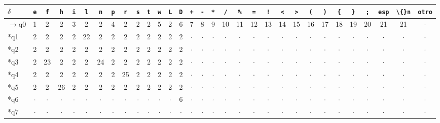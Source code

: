 \begin{longtable}{l|cccccccccccccccccccccccccccccc}
$\delta$ & \texttt{e} & \texttt{f} & \texttt{h} & \texttt{i} & \texttt{l} & \texttt{n} & \texttt{p} & \texttt{r} & \texttt{s} & \texttt{t} & \texttt{w} & \texttt{L} & \texttt{D} & \texttt{+} & \texttt{-} & \texttt{*} & \texttt{/} & \texttt{\%} & \texttt{=} & \texttt{!} & \texttt{<} & \texttt{>} & \texttt{(} & \texttt{)} & \texttt{\{} & \texttt{\}} & \texttt{;} & \texttt{esp} & \texttt{\textbackslash\{\}n} & \texttt{otro} \\ \hline
\endhead
$\rightarrow$q0 & 1 & 2 & 2 & 3 & 2 & 2 & 4 & 2 & 2 & 2 & 5 & 2 & 6 & 7 & 8 & 9 & 10 & 11 & 12 & 13 & 14 & 15 & 16 & 17 & 18 & 19 & 20 & 21 & 21 & $\cdot$ \\
*q1 & 2 & 2 & 2 & 2 & 22 & 2 & 2 & 2 & 2 & 2 & 2 & 2 & 2 & $\cdot$ & $\cdot$ & $\cdot$ & $\cdot$ & $\cdot$ & $\cdot$ & $\cdot$ & $\cdot$ & $\cdot$ & $\cdot$ & $\cdot$ & $\cdot$ & $\cdot$ & $\cdot$ & $\cdot$ & $\cdot$ & $\cdot$ \\
*q2 & 2 & 2 & 2 & 2 & 2 & 2 & 2 & 2 & 2 & 2 & 2 & 2 & 2 & $\cdot$ & $\cdot$ & $\cdot$ & $\cdot$ & $\cdot$ & $\cdot$ & $\cdot$ & $\cdot$ & $\cdot$ & $\cdot$ & $\cdot$ & $\cdot$ & $\cdot$ & $\cdot$ & $\cdot$ & $\cdot$ & $\cdot$ \\
*q3 & 2 & 23 & 2 & 2 & 2 & 24 & 2 & 2 & 2 & 2 & 2 & 2 & 2 & $\cdot$ & $\cdot$ & $\cdot$ & $\cdot$ & $\cdot$ & $\cdot$ & $\cdot$ & $\cdot$ & $\cdot$ & $\cdot$ & $\cdot$ & $\cdot$ & $\cdot$ & $\cdot$ & $\cdot$ & $\cdot$ & $\cdot$ \\
*q4 & 2 & 2 & 2 & 2 & 2 & 2 & 2 & 25 & 2 & 2 & 2 & 2 & 2 & $\cdot$ & $\cdot$ & $\cdot$ & $\cdot$ & $\cdot$ & $\cdot$ & $\cdot$ & $\cdot$ & $\cdot$ & $\cdot$ & $\cdot$ & $\cdot$ & $\cdot$ & $\cdot$ & $\cdot$ & $\cdot$ & $\cdot$ \\
*q5 & 2 & 2 & 26 & 2 & 2 & 2 & 2 & 2 & 2 & 2 & 2 & 2 & 2 & $\cdot$ & $\cdot$ & $\cdot$ & $\cdot$ & $\cdot$ & $\cdot$ & $\cdot$ & $\cdot$ & $\cdot$ & $\cdot$ & $\cdot$ & $\cdot$ & $\cdot$ & $\cdot$ & $\cdot$ & $\cdot$ & $\cdot$ \\
*q6 & $\cdot$ & $\cdot$ & $\cdot$ & $\cdot$ & $\cdot$ & $\cdot$ & $\cdot$ & $\cdot$ & $\cdot$ & $\cdot$ & $\cdot$ & $\cdot$ & 6 & $\cdot$ & $\cdot$ & $\cdot$ & $\cdot$ & $\cdot$ & $\cdot$ & $\cdot$ & $\cdot$ & $\cdot$ & $\cdot$ & $\cdot$ & $\cdot$ & $\cdot$ & $\cdot$ & $\cdot$ & $\cdot$ & $\cdot$ \\
*q7 & $\cdot$ & $\cdot$ & $\cdot$ & $\cdot$ & $\cdot$ & $\cdot$ & $\cdot$ & $\cdot$ & $\cdot$ & $\cdot$ & $\cdot$ & $\cdot$ & $\cdot$ & $\cdot$ & $\cdot$ & $\cdot$ & $\cdot$ & $\cdot$ & $\cdot$ & $\cdot$ & $\cdot$ & $\cdot$ & $\cdot$ & $\cdot$ & $\cdot$ & $\cdot$ & $\cdot$ & $\cdot$ & $\cdot$ & $\cdot$ \\

\end{longtable}
